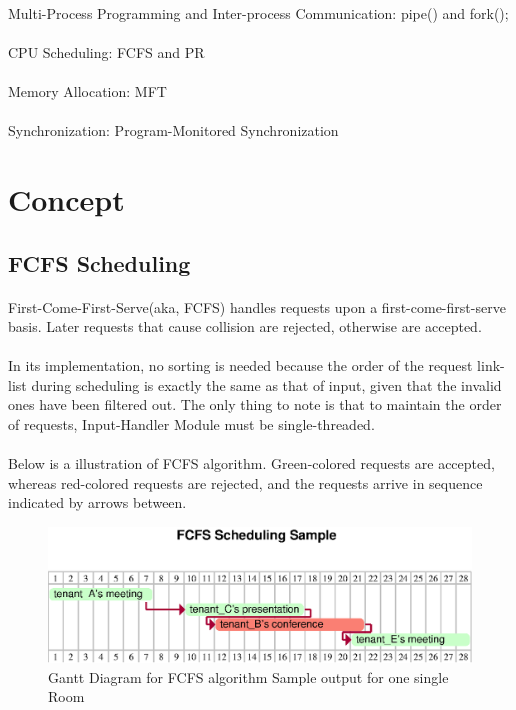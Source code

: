 \documentclass{article}
\begin{document}
        \paragraph{}
        Multi-Process Programming and Inter-process Communication: pipe() and fork(); 
        \paragraph{}
        CPU Scheduling: FCFS and PR 
        \paragraph{}
        Memory Allocation: MFT
        \paragraph{}
        Synchronization: Program-Monitored Synchronization 
    \cleardoublepage
    \section{Concept}
        \subsection{FCFS Scheduling}
            \paragraph{}
                First-Come-First-Serve(aka, FCFS) handles requests upon a first-come-first-serve basis. Later requests that cause collision are rejected, otherwise are accepted.
            \paragraph{}
                In its implementation, no sorting is needed because the order of the request link-list during scheduling is exactly the same as that of input, given that the invalid ones have been filtered out. The only thing to note is that to maintain the order of requests, Input-Handler Module must be single-threaded.
            \paragraph{}
                Below is a illustration of FCFS algorithm. Green-colored requests are accepted, whereas red-colored requests are rejected, and the requests arrive in sequence indicated by arrows between. 
            \begin{figure}[!htbp]
                \centering
                \includegraphics[scale=0.7]{../res/eps/fcfs_scheduling.eps}
                \caption{Gantt Diagram for FCFS algorithm Sample output for one single Room}
            \end{figure}
\end{document}
